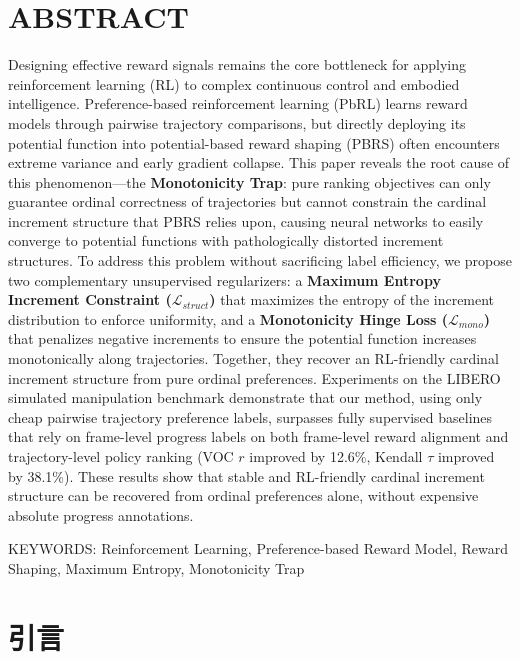 \section*{ABSTRACT}
Designing effective reward signals remains the core bottleneck for applying reinforcement learning (RL) to complex continuous control and embodied intelligence. Preference-based reinforcement learning (PbRL) learns reward models through pairwise trajectory comparisons, but directly deploying its potential function into potential-based reward shaping (PBRS) often encounters extreme variance and early gradient collapse. This paper reveals the root cause of this phenomenon---the \textbf{Monotonicity Trap}: pure ranking objectives can only guarantee ordinal correctness of trajectories but cannot constrain the cardinal increment structure that PBRS relies upon, causing neural networks to easily converge to potential functions with pathologically distorted increment structures. To address this problem without sacrificing label efficiency, we propose two complementary unsupervised regularizers: a \textbf{Maximum Entropy Increment Constraint ($\mathcal{L}_{struct}$)} that maximizes the entropy of the increment distribution to enforce uniformity, and a \textbf{Monotonicity Hinge Loss ($\mathcal{L}_{mono}$)} that penalizes negative increments to ensure the potential function increases monotonically along trajectories. Together, they recover an RL-friendly cardinal increment structure from pure ordinal preferences. Experiments on the LIBERO simulated manipulation benchmark demonstrate that our method, using only cheap pairwise trajectory preference labels, surpasses fully supervised baselines that rely on frame-level progress labels on both frame-level reward alignment and trajectory-level policy ranking (VOC $r$ improved by 12.6\%, Kendall $\tau$ improved by 38.1\%). These results show that stable and RL-friendly cardinal increment structure can be recovered from ordinal preferences alone, without expensive absolute progress annotations.

\vspace{1em}\noindent
{\hei KEYWORDS:}
{\songti \rmfamily Reinforcement Learning, Preference-based Reward Model, Reward Shaping, Maximum Entropy, Monotonicity Trap}

\clearpage



\setcounter{page}{1}

\section{引言}

